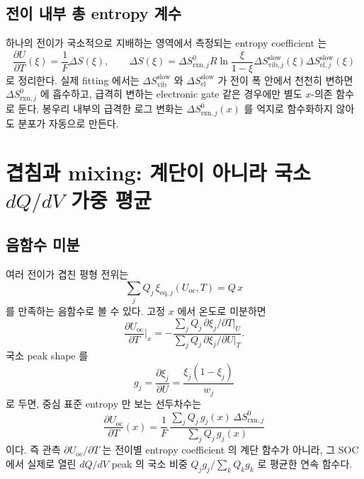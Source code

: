 \documentclass[11pt,a4paper]{article}
\newcommand{\rxn}{\mathrm{rxn}}
\newcommand{\eq}{\mathrm{eq}}
\newcommand{\oc}{\mathrm{oc}}
\newcommand{\vib}{\mathrm{vib}}
\newcommand{\el}{\mathrm{el}}
\begin{document}
\subsection{전이 내부 총 entropy 계수}
하나의 전이가 국소적으로 지배하는 영역에서 측정되는 entropy coefficient 는
\begin{equation}
\boxed{\;
\frac{\partial U}{\partial T}(\xi)
=\frac{1}{F}\Delta S(\xi),\qquad
\Delta S(\xi)=
\Delta S^0_{\rxn,j}
R\ln\frac{\xi}{1-\xi}
\Delta S_{\vib,j}^{\mathrm{slow}}(\xi)
\Delta S_{\el,j}^{\mathrm{slow}}(\xi)
\;}
\label{eq:decomp}
\end{equation}
로 정리한다. 실제 fitting 에서는 $\Delta S_{\vib}^{\mathrm{slow}}$ 와
$\Delta S_{\el}^{\mathrm{slow}}$ 가 전이 폭 안에서 천천히 변하면
$\Delta S^0_{\rxn,j}$ 에 흡수하고, 급격히 변하는 electronic gate 같은 경우에만
별도 $x$-의존 함수로 둔다. 봉우리 내부의 급격한 로그 변화는
$\Delta S^0_{\rxn,j}(x)$ 를 억지로 함수화하지 않아도 분포가 자동으로 만든다.

\section{\texorpdfstring{겹침과 mixing: 계단이 아니라 국소 $dQ/dV$ 가중 평균}{겹침과 mixing: 계단이 아니라 국소 dQ/dV 가중 평균}}
\label{sec:mixing}
\subsection{음함수 미분}
여러 전이가 겹친 평형 전위는
\begin{equation}
\sum_j Q_j\,\xi_{\eq,j}(U_\oc,T)=Q\,x
\label{eq:implicit_ocv}
\end{equation}
를 만족하는 음함수로 볼 수 있다. 고정 $x$ 에서 온도로 미분하면
\begin{equation}
\frac{\partial U_\oc}{\partial T}\bigg|_x
=-\frac{\sum_j Q_j\,\partial \xi_j/\partial T|_{U}}
        {\sum_j Q_j\,\partial \xi_j/\partial U|_{T}}.
\label{eq:implicit_derivative}
\end{equation}
국소 peak shape 를
\begin{equation}
g_j=\frac{\partial \xi_j}{\partial U}
=\frac{\xi_j(1-\xi_j)}{w_j}
\label{eq:gj}
\end{equation}
로 두면, 중심 표준 entropy 만 보는 선두차수는
\begin{equation}
\boxed{\;
\frac{\partial U_\oc}{\partial T}(x)
=\frac{1}{F}\,
\frac{\sum_j Q_j\,g_j(x)\,\Delta S^0_{\rxn,j}}
     {\sum_j Q_j\,g_j(x)}
\;}
\label{eq:overlap_simple}
\end{equation}
이다. 즉 관측 $\partial U_\oc/\partial T$ 는 전이별 entropy coefficient 의 계단
함수가 아니라, 그 SOC 에서 실제로 열린 $dQ/dV$ peak 의 국소 비중
$Q_jg_j/\sum_kQ_kg_k$ 로 평균한 연속 함수다.
\end{document}
